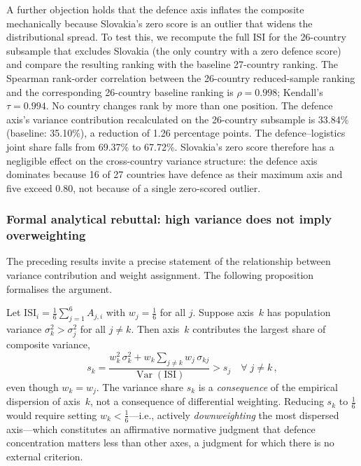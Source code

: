 A further objection holds that the defence axis inflates the
composite mechanically because Slovakia's zero score is an outlier
that widens the distributional spread.  To test this, we recompute
the full ISI for the 26-country subsample that excludes Slovakia
(the only country with a zero defence score) and compare the
resulting ranking with the baseline 27-country ranking.  The
Spearman rank-order correlation between the 26-country
reduced-sample ranking and the corresponding 26-country baseline
ranking is $\rho = 0.998$; Kendall's $\tau = 0.994$.  No country
changes rank by more than one position.  The defence axis's variance
contribution recalculated on the 26-country subsample is 33.84\%
(baseline: 35.10\%), a reduction of 1.26 percentage points.  The
defence--logistics joint share falls from 69.37\% to 67.72\%.
Slovakia's zero score therefore has a negligible effect on the
cross-country variance structure: the defence axis dominates because
16 of 27 countries have defence as their maximum axis and five
exceed 0.80, not because of a single zero-scored outlier.

\subsubsection{Formal analytical rebuttal: high variance does not
imply overweighting}\label{sec:variance-not-overweighting}

The preceding results invite a precise statement of the relationship
between variance contribution and weight assignment.  The following
proposition formalises the argument.

\begin{tcolorbox}[
  colback=gray!3, colframe=gray!60!black,
  title={\small\bfseries Proposition~2 (Variance dominance under equal
    weighting)},
  fonttitle=\small, boxrule=0.5pt, arc=2pt,
  left=4pt, right=4pt, top=3pt, bottom=3pt
]
\small
Let $\text{ISI}_i = \frac{1}{6}\sum_{j=1}^{6} A_{j,i}$ with
$w_j = \frac{1}{6}$ for all $j$.  Suppose axis~$k$ has population
variance $\sigma_k^2 > \sigma_j^2$ for all $j \neq k$.  Then
axis~$k$ contributes the largest share of composite variance,
\[
  s_k
  = \frac{w_k^2\,\sigma_k^2 + w_k\sum_{j\neq k}w_j\,\sigma_{kj}}
         {\operatorname{Var}(\text{ISI})}
  > s_j\quad \forall\; j \neq k\,,
\]
even though $w_k = w_j$.  The variance share $s_k$ is a
\emph{consequence} of the empirical dispersion of axis~$k$, not a
consequence of differential weighting.  Reducing $s_k$ to
$\frac{1}{6}$ would require setting $w_k < \frac{1}{6}$---i.e.,
actively \emph{downweighting} the most dispersed axis---which
constitutes an affirmative normative judgment that defence
concentration matters less than other axes, a judgment for which
there is no external criterion.
\end{tcolorbox}

